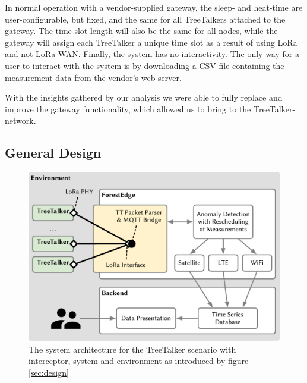 In normal operation with a vendor-supplied gateway, the sleep- and heat-time are user-configurable, but fixed, and the same for all TreeTalkers attached to the gateway.
The time slot length will also be the same for all nodes, while the gateway will assign each TreeTalker a unique time slot as a result of using LoRa and not LoRa-WAN.
Finally, the system has no interactivity.
The only way for a user to interact with the system is by downloading a CSV-file containing the measurement data from the vendor's web server.

With the insights gathered by our analysis we were able to fully replace and improve the gateway functionality, which allowed us to bring \mm to the TreeTalker-network.




\subsection{General Design}
\label{sec:TreeTalker:design}

\begin{figure}
    \centering
    \includegraphics[width=\linewidth]{figures/MechanismInterceptionTTT.pdf}
    \caption{The system architecture for the TreeTalker scenario with interceptor, system and environment as introduced by figure \ref{sec:design}}
    \label{fig:MechanismInterceptionTTT}
\end{figure}

